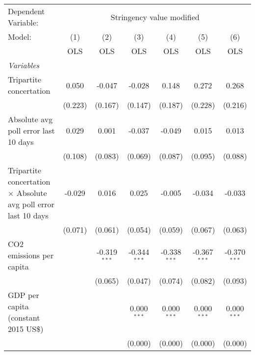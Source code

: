 
\begingroup
\centering
\begin{tabular}{lcccccc}
   \toprule
   Dependent Variable: & \multicolumn{6}{c}{Stringency value modified}\\
   Model:                                                                 & (1)     & (2)            & (3)            & (4)            & (5)            & (6)\\  
                                                                          &  OLS    & OLS            & OLS            & OLS            & OLS            & OLS\\  
   \midrule
   \emph{Variables}\\
   Tripartite concertation                                                & 0.050   & -0.047         & -0.028         & 0.148          & 0.272          & 0.268\\   
                                                                          & (0.223) & (0.167)        & (0.147)        & (0.187)        & (0.228)        & (0.216)\\   
   Absolute avg poll error last 10 days                                   & 0.029   & 0.001          & -0.037         & -0.049         & 0.015          & 0.013\\   
                                                                          & (0.108) & (0.083)        & (0.069)        & (0.087)        & (0.095)        & (0.088)\\   
   Tripartite concertation $\times$ Absolute avg poll error last 10 days  & -0.029  & 0.016          & 0.025          & -0.005         & -0.034         & -0.033\\   
                                                                          & (0.071) & (0.061)        & (0.054)        & (0.059)        & (0.067)        & (0.063)\\   
   CO2 emissions per capita                                               &         & -0.319$^{***}$ & -0.344$^{***}$ & -0.338$^{***}$ & -0.367$^{***}$ & -0.370$^{***}$\\   
                                                                          &         & (0.065)        & (0.047)        & (0.074)        & (0.082)        & (0.093)\\   
   GDP per capita (constant 2015 US\$)                                    &         &                & 0.000$^{***}$  & 0.000$^{***}$  & 0.000$^{***}$  & 0.000$^{***}$\\   
                                                                          &         &                & (0.000)        & (0.000)        & (0.000)        & (0.000)\\   

\end{tabular}
